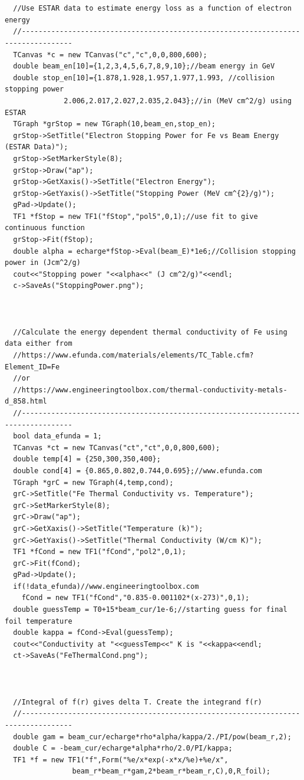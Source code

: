 \documentclass[12pt]{article}
\begin{document}
\begin{lstlisting}
  

  //Use ESTAR data to estimate energy loss as a function of electron energy
  //----------------------------------------------------------------------------------
  TCanvas *c = new TCanvas("c","c",0,0,800,600);
  double beam_en[10]={1,2,3,4,5,6,7,8,9,10};//beam energy in GeV
  double stop_en[10]={1.878,1.928,1.957,1.977,1.993, //collision stopping power 
		      2.006,2.017,2.027,2.035,2.043};//in (MeV cm^2/g) using ESTAR
  TGraph *grStop = new TGraph(10,beam_en,stop_en);
  grStop->SetTitle("Electron Stopping Power for Fe vs Beam Energy (ESTAR Data)");
  grStop->SetMarkerStyle(8);
  grStop->Draw("ap");
  grStop->GetXaxis()->SetTitle("Electron Energy");
  grStop->GetYaxis()->SetTitle("Stopping Power (MeV cm^{2}/g)");
  gPad->Update();
  TF1 *fStop = new TF1("fStop","pol5",0,1);//use fit to give continuous function
  grStop->Fit(fStop);  
  double alpha = echarge*fStop->Eval(beam_E)*1e6;//Collision stopping power in (Jcm^2/g)
  cout<<"Stopping power "<<alpha<<" (J cm^2/g)"<<endl;
  c->SaveAs("StoppingPower.png");

  

  //Calculate the energy dependent thermal conductivity of Fe using data either from
  //https://www.efunda.com/materials/elements/TC_Table.cfm?Element_ID=Fe
  //or
  //https://www.engineeringtoolbox.com/thermal-conductivity-metals-d_858.html
  //----------------------------------------------------------------------------------
  bool data_efunda = 1;
  TCanvas *ct = new TCanvas("ct","ct",0,0,800,600);
  double temp[4] = {250,300,350,400};
  double cond[4] = {0.865,0.802,0.744,0.695};//www.efunda.com
  TGraph *grC = new TGraph(4,temp,cond);
  grC->SetTitle("Fe Thermal Conductivity vs. Temperature");
  grC->SetMarkerStyle(8);
  grC->Draw("ap");
  grC->GetXaxis()->SetTitle("Temperature (k)");
  grC->GetYaxis()->SetTitle("Thermal Conductivity (W/cm K)");
  TF1 *fCond = new TF1("fCond","pol2",0,1);
  grC->Fit(fCond);
  gPad->Update();
  if(!data_efunda)//www.engineeringtoolbox.com
    fCond = new TF1("fCond","0.835-0.001102*(x-273)",0,1);
  double guessTemp = T0+15*beam_cur/1e-6;//starting guess for final foil temperature
  double kappa = fCond->Eval(guessTemp);
  cout<<"Conductivity at "<<guessTemp<<" K is "<<kappa<<endl;
  ct->SaveAs("FeThermalCond.png");


  
  //Integral of f(r) gives delta T. Create the integrand f(r) 
  //----------------------------------------------------------------------------------
  double gam = beam_cur/echarge*rho*alpha/kappa/2./PI/pow(beam_r,2);
  double C = -beam_cur/echarge*alpha*rho/2.0/PI/kappa;
  TF1 *f = new TF1("f",Form("%e/x*exp(-x*x/%e)+%e/x",
			    beam_r*beam_r*gam,2*beam_r*beam_r,C),0,R_foil);



\end{lstlisting}
\end{document}
